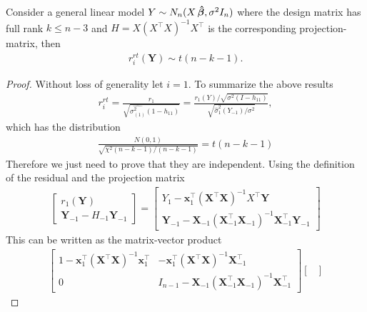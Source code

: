 \begin{proposition}
    Consider a general linear model $Y \sim N_n(X \operatorname{\boldsymbol{\hat{\beta}}}, \sigma^2 I_n)$ where the design matrix has full rank $k \leq n-3$ and $H = X (X^\top X)^{-1}X^\top$ is the corresponding projection-matrix, then
    \begin{align*}
        r_i^{rt}(\textbf{Y}) \sim t(n-k-1).
    \end{align*}
\end{proposition}
\begin{proof}
    Without loss of generality let $i=1$. 
    To summarize the above results
    \begin{align*}
        r_i^{rt} = \frac{r_1}{\sqrt{\hat{\sigma^2_{(1)}}(1-h_{11})}}
        =
        \frac{r_1(Y)/ \sqrt{\sigma^2 (I-h_{11})}}{\sqrt{\hat{\sigma}_1^2 (Y_{-1})/\sigma^2}},
    \end{align*}
    which has the distribution
    \begin{align*}
        \frac{N(0,1)}{\sqrt{\chi^2(n-k-1)/(n-k-1)}} = t(n-k-1)
    \end{align*}
    Therefore we just need to prove that they are independent.
    Using the definition of the residual and the projection matrix
    \begin{align*}
        \begin{bmatrix}
            r_1(\textbf{Y}) \\
            \textbf{Y}_{-1} - H_{-1} \textbf{Y}_{-1}
        \end{bmatrix}
        =
        \begin{bmatrix}
            Y_1 - \textbf{x}_1^\top (\textbf{X}^\top \textbf{X})^{-1} X^\top \textbf{Y} \\
            \textbf{Y}_{-1} - \textbf{X}_{-1} (\textbf{X}_{-1}^\top \textbf{X}_{-1})^{-1} \textbf{X}_{-1}^\top \textbf{Y}_{-1}
        \end{bmatrix}
    \end{align*}
    This can be written as the matrix-vector product
    \begin{align*}
        \begin{bmatrix}
            1 - \textbf{x}_1^\top (\textbf{X}^\top \textbf{X})^{-1} \textbf{x}_1^\top & - \textbf{x}_1^\top (\textbf{X}^\top \textbf{X})^{-1} \textbf{X}_{-1}^\top \\
            0 & I_{n-1} - \textbf{X}_{-1} (\textbf{X}_{-1}^\top \textbf{X}_{-1})^{-1} \textbf{X}_{-1}^\top
        \end{bmatrix}
        \begin{bmatrix}

\end{bmatrix}
\end{align*}
\end{proof}
